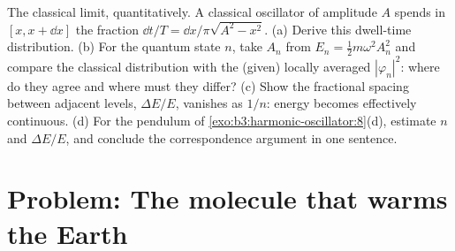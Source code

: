 \begin{exercise}[$\star\star\star$]\label{exo:b3:harmonic-oscillator:12}
The classical limit, quantitatively. A classical oscillator of
amplitude $A$ spends in $[x, x + \dd x]$ the fraction $\dd
t/T = \dd x/\pi\sqrt{A^2 - x^2}$. (a) Derive this dwell-time
distribution. (b) For the quantum state $n$, take $A_n$ from $E_n =
\tfrac12 m\omega^2A_n^2$ and compare the classical distribution with
the (given) locally averaged $|\varphi_n|^2$: where do they agree
and where must they differ? (c) Show the fractional spacing between
adjacent levels, $\Delta E/E$, vanishes as $1/n$: energy becomes
effectively continuous. (d) For the pendulum of
\cref{exo:b3:harmonic-oscillator:8}(d), estimate $n$ and $\Delta
E/E$, and conclude the correspondence argument in one sentence.
\end{exercise}

\section{Problem: The molecule that warms the Earth}

